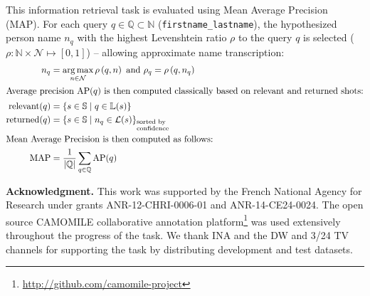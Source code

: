 \documentclass{acm_proc_article-me}
\newcommand\queries{\mathbb{Q}}
\newcommand\refLabels{\mathbb{L}}
\newcommand\refNames{\mathbb{N}}
\newcommand\shots{\mathbb{S}}
\newcommand\hypLabels{\mathcal{L}}
\newcommand\hypNames{\mathcal{N}}
\newcommand\ratio{\rho}
\DeclareMathOperator*{\argmax}{arg\,max}
\begin{document}
This information retrieval task is evaluated using Mean Average Precision (MAP).
For each query $q \in \queries \subset \refNames$ (\texttt{first\-name\_lastname}), the hypothesized person name $n_q$ with the highest Levenshtein ratio $\rho$ to the query $q$ is selected ($\ratio : \refNames \times \hypNames \mapsto [0, 1]$) -- allowing approximate name transcription:
\begin{align}
\displaystyle n_q & = \argmax_{n \in \hypNames} \rho\left(q, n \right) \text{ and } \rho_q = \rho\left(q, n_q \right) \nonumber \\
\intertext{Average precision $\text{AP}(q)$ is then computed classically based on relevant and returned shots:}
\text{relevant}(q) & = \{ s \in \shots \;|\; q \in \refLabels(s) \} \nonumber \\
\text{returned}(q) & = {\{ s \in \shots \;|\; n_q \in \hypLabels(s) \}}_{\begin{subarray}{l}\text{sorted by}\\
    \text{confidence}\end{subarray}} \nonumber \\
\intertext{Mean Average Precision is then computed as follows:}
            \text{MAP} & = \frac{1}{|\queries|} \sum_{q \in \queries} \text{AP}(q) \nonumber
\end{align}

\noindent\textbf{Acknowledgment.} This work was supported by the French National Agency for Research under grants ANR-12-CHRI-0006-01 and ANR-14-CE24-0024. The open source CAMO\-MILE collaborative annotation platform\footnote{\url{http://github.com/camomile-project}} was used extensively throughout the progress of the task. %
We thank INA and the DW and 3/24 TV channels for supporting the task by distributing development and test datasets.

\newpage



\end{document}
